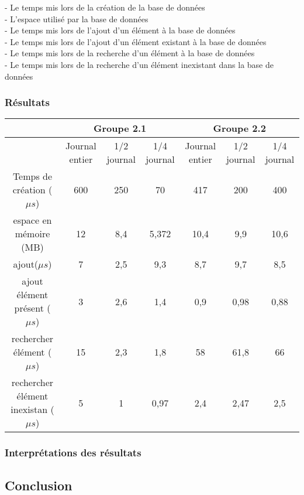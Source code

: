 \documentclass[a4paper ,12pt]{article}
\begin{document}
- Le temps mis lors de la création de la base de données\\
- L'espace utilisé par la base de données\\
- Le temps mis lors de l'ajout d'un élément à la base de données\\
- Le temps mis lors de l'ajout d'un élément existant à la base de données\\
- Le temps mis lors de la recherche d'un élément à la base de données\\
- Le temps mis lors de la recherche d'un élément inexistant dans la base de données\\
 

 

\subsubsection{Résultats}

\begin{center}

\begin{tabular}{|c|c|c|c|c|c|c|}
   \hline 
    & \multicolumn{3}{c|}{{\tiny Groupe 2.1}} &\multicolumn{3}{c|}{{\tiny Groupe 2.2}} \\ 
   \hline 
    &{\tiny  Journal entier} &{\tiny  1/2 journal }& {\tiny 1/4 journal} &{\tiny  Journal entier} & {\tiny 1/2 journal }&{\tiny  1/4 journal} \\ 
   \hline 
  {\tiny  Temps de création ($\mu s$)} & 600 & 250 & 70 & 417 & 200 & 400 \\ 
   \hline 
   {\tiny espace en mémoire (MB)} & 12  & 8,4  & 5,372  & 10,4  & 9,9  & 10,6  \\ 
   \hline 
   {\tiny ajout($\mu s$)}& 7 & 2,5 & 9,3 & 8,7 & 9,7 & 8,5 \\ 
   \hline 
   {\tiny ajout élément présent ($\mu s$)} & 3 & 2,6 & 1,4 & 0,9 & 0,98 & 0,88 \\ 
   \hline 
  {\tiny  rechercher élément ($\mu s$)} & 15 & 2,3 & 1,8 & 58 & 61,8 & 66 \\ 
   \hline 
  {\tiny  rechercher élément inexistan ($\mu s$)} & 5 & 1 & 0,97 & 2,4 & 2,47 & 2,5 \\ 
   \hline 
   \end{tabular}   
     
\end{center} 

\subsubsection{Interprétations des résultats}

\subsection{Conclusion}
\end{document}
